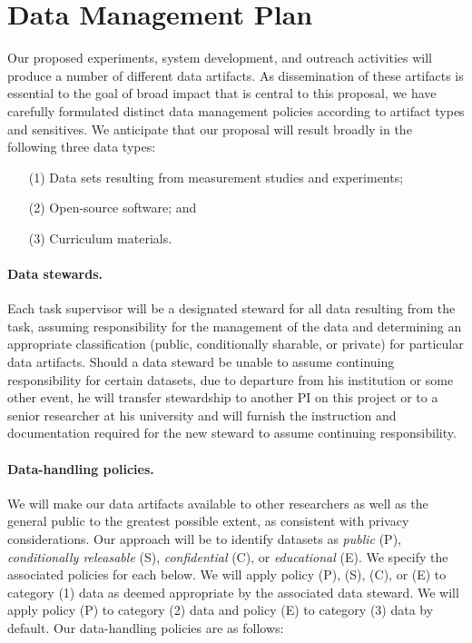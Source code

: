 \section*{Data Management Plan} 

Our proposed experiments, system development, and outreach activities will
produce a number of different data artifacts. As dissemination of these
artifacts is essential to the goal of broad impact that is central to this
proposal, we have carefully formulated distinct data management policies
according to artifact types and sensitives. We anticipate that our proposal
will result broadly in the following three data types:

\begin{enumerate}
\item[(1)] Data sets resulting from measurement studies and experiments;
\item[(2)] Open-source software; and
\item[(3)] Curriculum materials.
\end{enumerate}

\paragraph{Data stewards.} Each task supervisor will be a designated steward for
all data resulting from the task, assuming responsibility for the management of
the data and determining an appropriate classification (public, conditionally
sharable, or private) for particular data artifacts. Should a data steward be
unable to assume continuing responsibility for certain datasets, due to
departure from his institution or some other event, he will transfer stewardship
to another PI on this project or to a senior researcher at his university and
will furnish the instruction and documentation required for the new steward to
assume continuing responsibility.

\paragraph{Data-handling policies.} We will make our data artifacts available to
other researchers as well as the general public to the greatest possible extent,
as consistent with privacy considerations. Our approach will be to identify
datasets as {\em public} (P), {\em conditionally releasable} (S), {\em
confidential} (C), or {\em educational} (E). We specify the associated policies
for each below. We will apply policy (P), (S), (C), or (E) to category (1) data
as deemed appropriate by the associated data steward. We will apply policy (P)
to category (2) data and policy (E) to category (3) data by default. Our
data-handling policies are as follows:

